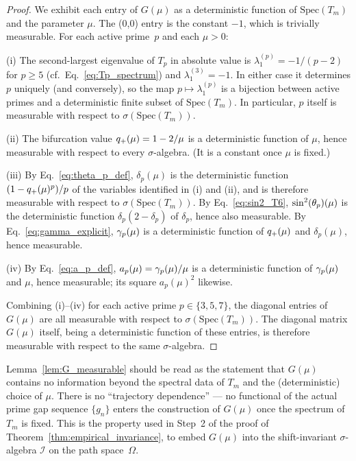 \begin{proof}
We exhibit each entry of $G(\mu)$ as a deterministic function of
$\mathrm{Spec}(T_m)$ and the parameter $\mu$. The (0,0) entry is the
constant $-1$, which is trivially measurable. For each active
prime~$p$ and each $\mu > 0$:

(i) The second-largest eigenvalue of $T_p$ in absolute value is
$\lambda^{(p)}_1 = -1/(p-2)$ for $p \geq 5$ (cf.\
Eq.~\eqref{eq:Tp_spectrum}) and $\lambda^{(3)}_1 = -1$. In either
case it determines $p$ uniquely (and conversely), so the map
$p \mapsto \lambda_1^{(p)}$ is a bijection between active primes
and a deterministic finite subset of $\mathrm{Spec}(T_m)$. In
particular, $p$ itself is measurable with respect to
$\sigma(\mathrm{Spec}(T_m))$.

(ii) The bifurcation value $q_{+}(\mu) = 1 - 2/\mu$ is a
deterministic function of $\mu$, hence measurable with respect to
every $\sigma$-algebra. (It is a constant once $\mu$ is fixed.)

(iii) By Eq.~\eqref{eq:theta_p_def}, $\delta_p(\mu)$ is the
deterministic function $(1 - q_{+}(\mu)^p)/p$ of the variables
identified in (i) and (ii), and is therefore measurable with
respect to $\sigma(\mathrm{Spec}(T_m))$. By
Eq.~\eqref{eq:sin2_T6}, $\sin^2(\theta_{p})(\mu)$ is the deterministic
function $\delta_p(2 - \delta_p)$ of $\delta_p$, hence also
measurable. By Eq.~\eqref{eq:gamma_explicit}, $\gamma_{p}(\mu)$ is a
deterministic function of $q_{+}(\mu)$ and $\delta_p(\mu)$,
hence measurable.

(iv) By Eq.~\eqref{eq:a_p_def}, $a_p(\mu) = \gamma_{p}(\mu)/\mu$ is
a deterministic function of $\gamma_{p}(\mu)$ and $\mu$, hence
measurable; its square $a_p(\mu)^2$ likewise.

Combining (i)--(iv) for each active prime $p \in \{3, 5, 7\}$, the
diagonal entries of $G(\mu)$ are all measurable with respect to
$\sigma(\mathrm{Spec}(T_m))$. The diagonal matrix $G(\mu)$
itself, being a deterministic function of these entries, is
therefore measurable with respect to the same $\sigma$-algebra.
\end{proof}

\begin{remark}
\label{rmk:measurable_meaning}
Lemma~\ref{lem:G_measurable} should be read as the statement that
$G(\mu)$ contains no information beyond the spectral data of
$T_m$ and the (deterministic) choice of $\mu$. There is no
``trajectory dependence'' --- no functional of the actual prime
gap sequence $\{g_n\}$ enters the construction of $G(\mu)$ once
the spectrum of $T_m$ is fixed. This is the property used in
Step~2 of the proof of Theorem~\ref{thm:empirical_invariance}, to
embed $G(\mu)$ into the shift-invariant $\sigma$-algebra
$\mathcal{I}$ on the path space~$\Omega$.
\end{remark}
